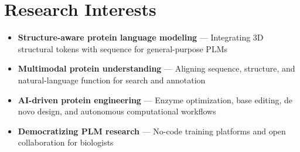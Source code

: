 \documentclass[10pt]{article}
\begin{document}
\section*{Research Interests}
\begin{itemize}
    \item \textbf{Structure-aware protein language modeling} --- Integrating 3D structural tokens with sequence for general-purpose PLMs
    \item \textbf{Multimodal protein understanding} --- Aligning sequence, structure, and natural-language function for search and annotation
    \item \textbf{AI-driven protein engineering} --- Enzyme optimization, base editing, de novo design, and autonomous computational workflows
    \item \textbf{Democratizing PLM research} --- No-code training platforms and open collaboration for biologists
\end{itemize}
\end{document}
